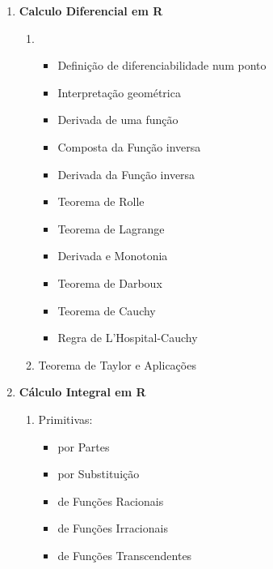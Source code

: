 \documentclass{article}
\begin{document}
\begin{multicols}{2}
\begin{enumerate}[label=\arabic*.]
\begin{enumerate}
	\end{enumerate}
	
	\vspace{3mm}
	
	\item {\bfseries
		Calculo Diferencial em R
	}
	\begin{enumerate}
	[label=\theenumi\arabic*., left = -5.4mm]
		
		\item \
		\begin{itemize}[left = -9mm]
		
			\item Definição de diferenciabilidade
				 num ponto
			\item Interpretação geométrica
			\item Derivada de uma função
			\item Composta da Função inversa
			\item Derivada da Função inversa
			\item Teorema de Rolle
			\item Teorema de Lagrange
			\item Derivada e Monotonia
			\item Teorema de Darboux
			\item Teorema de Cauchy
			\item Regra de L'Hospital-Cauchy
		
		\end{itemize}
		
		\item Teorema de Taylor e Aplicações
		
	\end{enumerate}
	
	\vspace{3mm}
	
	\item {\bfseries
		Cálculo Integral em R
	}
	\begin{enumerate}
	[label=\theenumi\arabic*., left = -5.4mm]
	
		\item Primitivas:
		\begin{itemize}[left = -9mm]
			
			\item por Partes
			\item por Substituição
			\item de Funções Racionais
			\item de Funções Irracionais
			\item de Funções Transcendentes
			

\end{itemize}
\end{enumerate}
\end{enumerate}
\end{multicols}
\end{document}
